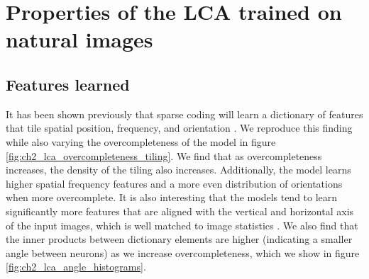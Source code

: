 \section{Properties of the LCA trained on natural images}\label{sec:ch2_lca_properties}
\subsection{Features learned}
It has been shown previously that sparse coding will learn a dictionary of features that tile spatial position, frequency, and orientation \parencite{olshausen1996emergence, olshausen1997sparse}. We reproduce this finding while also varying the overcompleteness of the model in figure \ref{fig:ch2_lca_overcompleteness_tiling}. We find that as overcompleteness increases, the density of the tiling also increases. Additionally, the model learns higher spatial frequency features and a more even distribution of orientations when more overcomplete. It is also interesting that the models tend to learn significantly more features that are aligned with the vertical and horizontal axis of the input images, which is well matched to image statistics \parencite{switkes1978spatial, torralba2003statistics}. We also find that the inner products between dictionary elements are higher (indicating a smaller angle between neurons) as we increase overcompleteness, which we show in figure \ref{fig:ch2_lca_angle_histograms}.

